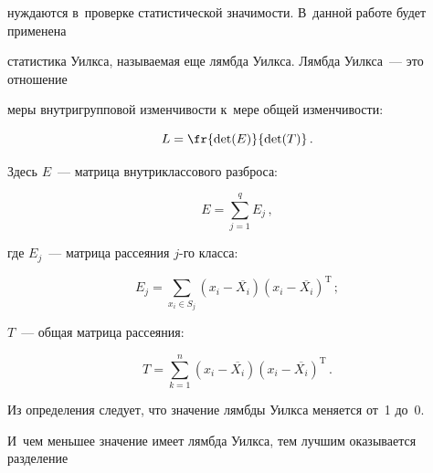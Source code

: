 нуждаются в~проверке статистической значимости. В~данной работе будет применена 

статистика Уилкса, называемая еще лямбда Уилкса. Лямбда Уилкса~--- это отношение 

меры внутригрупповой изменчивости к~мере общей изменчивости:

$$

L = \fr{\det(E)}{\det(T)}\,.

$$

Здесь $E$~--- матрица внутриклассового разброса:



\vspace*{2pt}



\noindent

$$

E = \sum\limits_{j=1}^q E_j\,,

$$

где $E_j$~--- матрица рассеяния $j$-го класса:



\vspace*{2pt}



\noindent

$$

E_j = \sum\limits_{x_i \in S_j} 

\left(x_i-\overline{X_i}\right)\left(x_i-\overline{X_i}\right)^{\mathrm{T}}\,;

$$



\vspace*{-2pt}



\noindent

$T$~---  общая матрица рассеяния:



\vspace*{2pt}



\noindent

$$

T = \sum\limits_{k=1}^n \left(x_i-\overline{X_i}\right)

\left(x_i-\overline{X_i}\right)^{\mathrm{T}}\,.

$$



Из определения следует, что значение лямбды Уилкса меняется от~1 до~0. 

И~чем меньшее значение имеет лямбда Уилкса, тем лучшим оказывается разделение 

